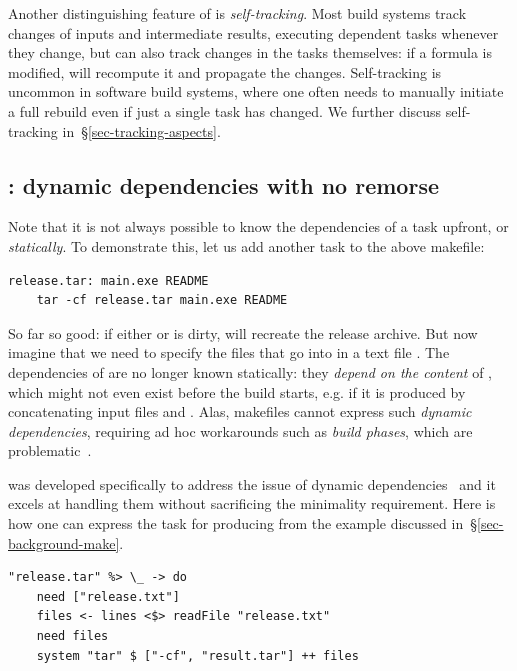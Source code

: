 Another distinguishing feature of \Excel is \emph{self-tracking}. Most build
systems track changes of inputs and intermediate results, executing dependent
tasks whenever they change, but \Excel can also track changes in the tasks
themselves: if a formula is modified, \Excel will recompute it and propagate
the changes. Self-tracking is uncommon in software build systems, where one
often needs to manually initiate a full rebuild even if just a single task has
changed. We further discuss self-tracking in~\S\ref{sec-tracking-aspects}.

\subsection{\Shake: dynamic dependencies with no remorse}
\label{sec-background-shake}

Note that it is not always possible to know the dependencies of a task upfront,
or \emph{statically}. To demonstrate this, let us add another task to the above
makefile:

\vspace{1mm}
\begin{verbatim}
release.tar: main.exe README
    tar -cf release.tar main.exe README
\end{verbatim}
\vspace{1mm}

\noindent
So far so good: if either  or  is dirty, \Make will
recreate the release archive. But now imagine that we need to specify the files
that go into  in a text file . The dependencies
of  are no longer known statically: they \emph{depend on the
content} of , which might not even exist before the build
starts, e.g. if it is produced by concatenating input files 
and . Alas, makefiles cannot express such \emph{dynamic
dependencies}, requiring ad hoc workarounds such as \emph{build phases}, which
are problematic~\cite{hadrian}.

\Shake was developed specifically to address the issue of dynamic
dependencies~\cite{mitchell2012shake} and it excels at handling them without
sacrificing the minimality requirement. Here is how one can express the task
for producing  from the example discussed
in~\S\ref{sec-background-make}.

\vspace{1mm}
\begin{verbatim}
"release.tar" %> \_ -> do
    need ["release.txt"]
    files <- lines <$> readFile "release.txt"
    need files
    system "tar" $ ["-cf", "result.tar"] ++ files
\end{verbatim}
\vspace{1mm}

